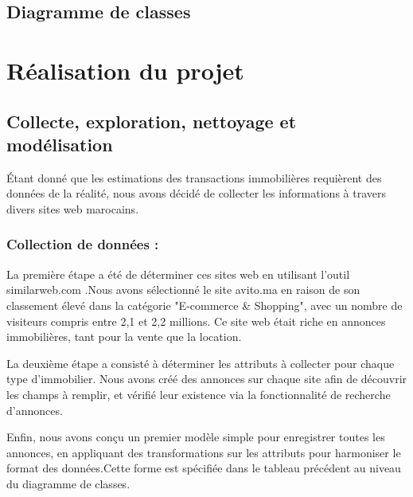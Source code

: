 \documentclass[a4paper,12pt]{report}
\numberwithin{equation}{section}
\begin{document}
\section{Diagramme de classes}
\vspace{0.5cm}

\newpage
\chapter{Réalisation du projet}
\section{Collecte, exploration, nettoyage et modélisation}
\par
Étant donné que les estimations des transactions immobilières requièrent des données de la réalité, nous avons décidé de collecter les informations à travers divers sites web marocains. 
\subsection{Collection de données : }
\par
La première étape a été de déterminer ces sites web en utilisant l'outil similarweb.com .Nous avons sélectionné le site avito.ma en raison de son classement élevé dans la catégorie "E-commerce \& Shopping", avec un nombre de visiteurs compris entre 2,1 et 2,2 millions. Ce site web était riche en annonces immobilières, tant pour la vente que la location.
\\ \par
La deuxième étape a consisté à déterminer les attributs à collecter pour chaque type d'immobilier. Nous avons créé des annonces sur chaque site afin de découvrir les champs à remplir, et vérifié leur existence via la fonctionnalité de recherche d'annonces.
\\ \par
Enfin, nous avons conçu un premier modèle simple pour enregistrer toutes les annonces, en appliquant des transformations sur les attributs pour harmoniser le format des données.Cette forme est spécifiée dans le tableau précédent au niveau du diagramme de classes.
\end{document}
